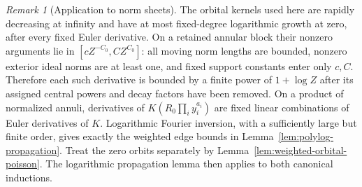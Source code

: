 \documentclass[11pt,a4paper]{article}
\numberwithin{equation}{section}
\theoremstyle{definition}
\theoremstyle{remark}
\newtheorem{remark}[theorem]{Remark}
\begin{document}
\begin{remark}[Application to norm sheets]\label{rem:polylog-norm-sheets}
The orbital kernels used here are rapidly decreasing at infinity and
have at most fixed-degree logarithmic growth at zero, after every
fixed Euler derivative.  On a retained annular block their nonzero
arguments lie in $[cZ^{-C_0},CZ^{C_0}]$: all moving norm lengths are
bounded, nonzero exterior ideal norms are at least one, and fixed
support constants enter only $c,C$.  Therefore each such derivative
is bounded by a finite power of $1+\log Z$ after its assigned central
powers and decay factors have been removed.  On a product of normalized
annuli, derivatives of $K(R_0\prod_i y_i^{a_i})$ are fixed linear
combinations of Euler derivatives of $K$.  Logarithmic Fourier inversion, with a sufficiently
large but finite order, gives exactly the weighted edge bounds in
Lemma~\ref{lem:polylog-propagation}.
Treat the zero orbits separately by
Lemma~\ref{lem:weighted-orbital-poisson}. The logarithmic propagation
lemma then applies to both canonical inductions.
\end{remark}
\end{document}

